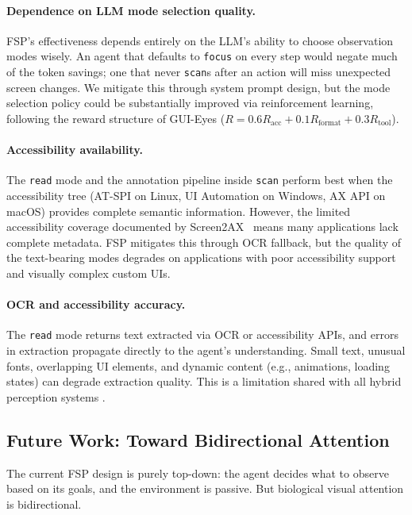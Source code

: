 \documentclass[11pt,a4paper]{article}
\begin{document}
\paragraph{Dependence on LLM mode selection quality.}
FSP's effectiveness depends entirely on the LLM's ability to choose observation modes wisely. An agent that defaults to \texttt{focus} on every step would negate much of the token savings; one that never \texttt{scan}s after an action will miss unexpected screen changes. We mitigate this through system prompt design, but the mode selection policy could be substantially improved via reinforcement learning, following the reward structure of GUI-Eyes \cite{gui-eyes} ($R = 0.6 R_{\text{acc}} + 0.1 R_{\text{format}} + 0.3 R_{\text{tool}}$).

\paragraph{Accessibility availability.}
The \texttt{read} mode and the annotation pipeline inside \texttt{scan} perform best when the accessibility tree (AT-SPI on Linux, UI Automation on Windows, AX API on macOS) provides complete semantic information. However, the limited accessibility coverage documented by Screen2AX~\cite{screen2ax} means many applications lack complete metadata. FSP mitigates this through OCR fallback, but the quality of the text-bearing modes degrades on applications with poor accessibility support and visually complex custom UIs.

\paragraph{OCR and accessibility accuracy.}
The \texttt{read} mode returns text extracted via OCR or accessibility APIs, and errors in extraction propagate directly to the agent's understanding. Small text, unusual fonts, overlapping UI elements, and dynamic content (e.g., animations, loading states) can degrade extraction quality. This is a limitation shared with all hybrid perception systems \cite{ufo2, agent-s2}.

\subsection{Future Work: Toward Bidirectional Attention}
\label{sec:future-bidirectional}

The current FSP design is purely top-down: the agent decides what to observe based on its goals, and the environment is passive. But biological visual attention is bidirectional.
\end{document}
